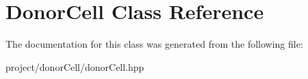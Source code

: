 \hypertarget{classDonorCell}{
\section{DonorCell Class Reference}
\label{classDonorCell}
}


The documentation for this class was generated from the following file:\begin{DoxyCompactItemize}
\item 
project/donorCell/donorCell.hpp\end{DoxyCompactItemize}
